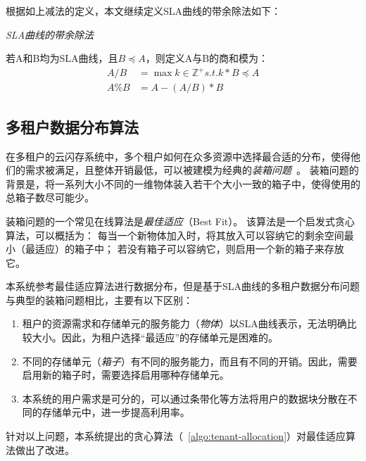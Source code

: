 根据如上减法的定义，本文继续定义SLA曲线的带余除法如下：

\begin{definition}
  \textit{SLA曲线的带余除法}

  若A和B均为SLA曲线，且$B \preceq A$，则定义A与B的商和模为：
  \begin{equation}
    \begin{split}
      A / B & = \max k \in \mathbb{Z}^{+} s.t. k * B \preceq A \\
      A \% B & = A - (A / B) * B
    \end{split}
  \end{equation}
\end{definition}


\subsection{多租户数据分布算法}
\label{sec:design-allocation-algo}

在多租户的云闪存系统中，多个租户如何在众多资源中选择最合适的分布，使得他们的需求被满足，且整体开销最低，可以被建模为经典的\textit{装箱问题}~\cite{wiki:Bin-packing}。
装箱问题的背景是，将一系列大小不同的一维物体装入若干个大小一致的箱子中，使得使用的总箱子数尽可能少。

装箱问题的一个常见在线算法是\textit{最佳适应}（Best Fit）。
该算法是一个启发式贪心算法，可以概括为：
每当一个新物体加入时，将其放入可以容纳它的剩余空间最小（最适应）的箱子中；
若没有箱子可以容纳它，则启用一个新的箱子来存放它。

本系统参考最佳适应算法进行数据分布，但是基于SLA曲线的多租户数据分布问题与典型的装箱问题相比，主要有以下区别：

\begin{enumerate}
  \item 租户的资源需求和存储单元的服务能力（\textit{物体}）以SLA曲线表示，无法明确比较大小。因此，为租户选择“最适应”的存储单元是困难的。
  \item 不同的存储单元（\textit{箱子}）有不同的服务能力，而且有不同的开销。因此，需要启用新的箱子时，需要选择启用哪种存储单元。
  \item 本系统的用户需求是可分的，可以通过条带化等方法将用户的数据块分散在不同的存储单元中，进一步提高利用率。
\end{enumerate}

针对以上问题，本系统提出的贪心算法（~\autoref{algo:tenant-allocation}）对最佳适应算法做出了改进。

